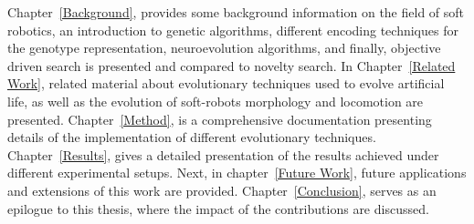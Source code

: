 Chapter~\ref{Background}, provides some background information on the field of soft robotics, an introduction to genetic algorithms, different encoding techniques for the genotype representation, neuroevolution algorithms, and finally, objective driven search is presented and compared to novelty search. In Chapter~\ref{Related Work}, related material about evolutionary techniques used to evolve artificial life, as well as the evolution of soft-robots morphology and locomotion are presented. Chapter~\ref{Method}, is a comprehensive documentation presenting details of the implementation of different evolutionary techniques. Chapter~\ref{Results}, gives a detailed presentation of the results achieved under different experimental setups. Next, in chapter~\ref{Future Work}, future applications and extensions of this work are provided. Chapter~\ref{Conclusion}, serves as an epilogue to this thesis, where the impact of the contributions are discussed.






